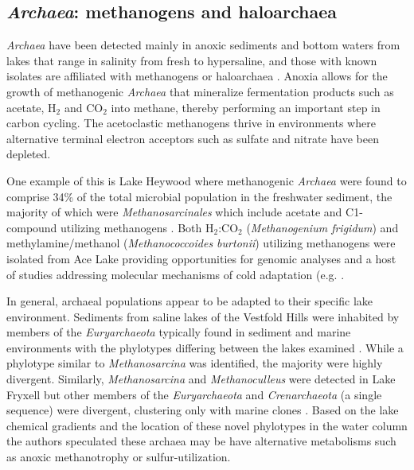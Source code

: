 \subsection{\emph{Archaea}: methanogens and haloarchaea}
\emph{Archaea} have been detected mainly in anoxic sediments and bottom waters from lakes that range in salinity from fresh to hypersaline, 
and those with known isolates are affiliated with methanogens or haloarchaea \cite{Bowman2000, Bowman2000a, Purdy2003, Kurasawa2010, Lauro2011}.
Anoxia allows for the growth of methanogenic \emph{Archaea} that mineralize fermentation products such as acetate, H$_2$ and CO$_2$ into methane, thereby performing an important step in carbon cycling.
The acetoclastic methanogens thrive in environments where alternative terminal electron acceptors such as sulfate and nitrate have been depleted. 

One example of this is Lake Heywood where methanogenic \emph{Archaea} were found to comprise 34\% of the total microbial population in the freshwater sediment, 
the majority of which were \emph{Methanosarcinales} which include acetate and C1-compound utilizing methanogens \cite{Purdy2003}. 
Both H$_2$:CO$_2$ (\emph{Methanogenium frigidum}) and methylamine/methanol (\emph{Methanococcoides burtonii}) utilizing methanogens were isolated from Ace Lake 
\cite{Franzmann1992, Franmann1997} providing opportunities for genomic analyses \cite{Saunders2003, Allen2009} and a host of studies addressing molecular mechanisms of cold adaptation 
(e.g. \cite{Cavicchioli2006, Williams2011}.

In general, archaeal populations appear to be adapted to their specific lake environment.
Sediments from saline lakes of the Vestfold Hills were inhabited by members of the \emph{Euryarchaeota} typically found in sediment and marine environments 
with the phylotypes differing between the lakes examined \cite{Bowman2000a}. 
While a phylotype similar to \emph{Methanosarcina} was identified, the majority were highly divergent. 
Similarly, \emph{Methanosarcina} and \emph{Methanoculleus} were detected in Lake Fryxell but other members of the \emph{Euryarchaeota} and \emph{Crenarchaeota} (a single sequence) were divergent, 
clustering only with marine clones \cite{Karr2006}. 
Based on the lake chemical gradients and the location of these novel phylotypes in the water column the authors speculated these archaea may be have alternative metabolisms such as anoxic methanotrophy or sulfur-utilization. 

